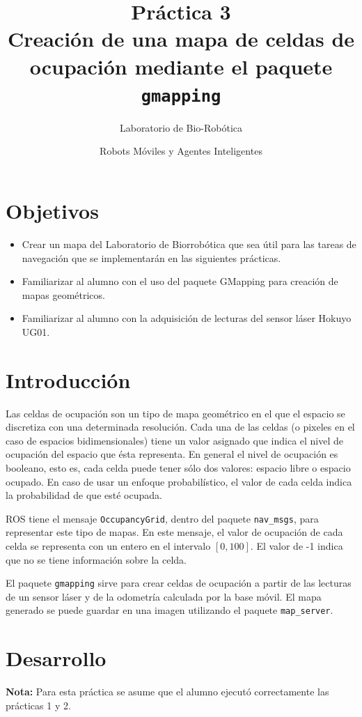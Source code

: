 \documentclass[letterpaper,12pt]{article}
\title{Práctica 3  \\ Creación de una mapa de celdas de ocupación mediante el paquete \texttt{gmapping}}
\author{Laboratorio de Bio-Robótica}
\date{Robots Móviles y Agentes Inteligentes}
\begin{document}
\renewcommand{\tablename}{Tabla}
\maketitle
\section*{Objetivos}
\begin{itemize}
\item Crear un mapa del Laboratorio de Biorrobótica que sea útil para las tareas de navegación que se implementarán en las siguientes prácticas. 
\item Familiarizar al alumno con el uso del paquete GMapping para creación de mapas geométricos.
\item Familiarizar al alumno con la adquisición de lecturas del sensor láser Hokuyo UG01.
\end{itemize}

\section{Introducción}
Las celdas de ocupación son un tipo de mapa geométrico en el que el espacio se discretiza con una determinada resolución. Cada una de las celdas (o pixeles en el caso de espacios bidimensionales) tiene un valor asignado que indica el nivel de ocupación del espacio que ésta representa. En general el nivel de ocupación es booleano, esto es, cada celda puede tener sólo dos valores: espacio libre o espacio ocupado. En caso de usar un enfoque probabilístico, el valor de cada celda indica la probabilidad de que esté ocupada. 

ROS tiene el mensaje \texttt{OccupancyGrid}, dentro del paquete \texttt{nav\_msgs}, para representar este tipo de mapas. En este mensaje, el valor de ocupación de cada celda se representa con un entero en el intervalo $[0,100]$. El valor de -1 indica que no se tiene información sobre la celda. 

El paquete \texttt{gmapping} sirve para crear celdas de ocupación a partir de las lecturas de un sensor láser y de la odometría calculada por la base móvil. El mapa generado se puede guardar en una imagen utilizando el paquete \texttt{map\_server}.

\section{Desarrollo}
\textbf{Nota:} Para esta práctica se asume que el alumno ejecutó correctamente las prácticas 1 y 2.
\end{document}
